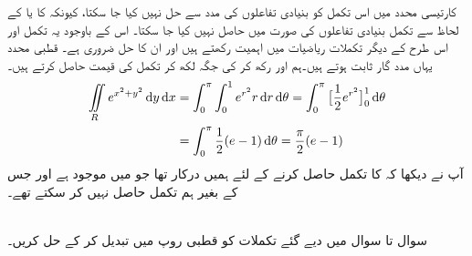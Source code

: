 کارتیسی محدد میں اس تکمل کو بنیادی تفاعلوں کی مدد سے حل نہیں کیا جا سکتا، کیونکہ  کا  یا  کے لحاظ سے تکمل بنیادی تفاعلوں کی صورت میں حاصل نہیں کیا جا سکتا۔ اس کے باوجود یہ تکمل اور اس طرح کے دیگر تکملات ریاضیات میں اہمیت رکھتے ہیں اور ان کا حل ضروری ہے۔ قطبی محدد یہاں مدد گار ثابت ہوتے ہیں۔ہم  اور رکھ کر   کی جگہ  لکھ کر تکمل کی قیمت حاصل کرتے ہیں۔
\begin{align*}
\iint\limits_R e^{x^2+y^2}\dif y\dif x&=\int_0^{\pi}\int_0^1 e^{r^2}r\dif r\dif \theta=\int_0^{\pi}\big[\frac{1}{2}e^{r^2}\big]_0^1\dif\theta\\
&=\int_0^{\pi}\frac{1}{2}(e-1)\dif\theta=\frac{\pi}{2}(e-1)
\end{align*}
آپ نے دیکھا کہ     کا تکمل  حاصل کرنے  کے لئے  ہمیں   درکار  تھا   جو     میں موجود ہے اور جس کے بغیر ہم تکمل حاصل نہیں کر سکتے  تھے۔

\\
سوال  تا سوال   میں دیے گئے تکملات کو  قطبی روپ میں تبدیل کر کے حل کریں۔

